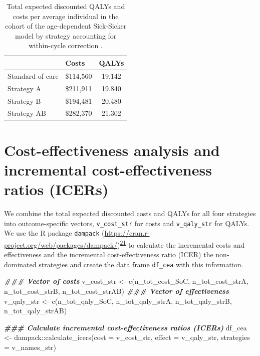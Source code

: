 \documentclass[
]{article}
\newenvironment{Shaded}{\begin{snugshade}}{\end{snugshade}}
\newcommand{\AttributeTok}[1]{\textcolor[rgb]{0.77,0.63,0.00}{#1}}
\newcommand{\DocumentationTok}[1]{\textcolor[rgb]{0.56,0.35,0.01}{\textbf{\textit{#1}}}}
\newcommand{\FunctionTok}[1]{\textcolor[rgb]{0.00,0.00,0.00}{#1}}
\newcommand{\NormalTok}[1]{#1}
\newcommand{\OtherTok}[1]{\textcolor[rgb]{0.56,0.35,0.01}{#1}}
\newcommand{\SpecialCharTok}[1]{\textcolor[rgb]{0.00,0.00,0.00}{#1}}
\begin{document}
\begin{table}[!h]

\caption{\label{tab:Expected-outcomes-table}Total expected discounted QALYs and costs per average individual in the cohort of the age-dependent Sick-Sicker model by strategy accounting for within-cycle correction .}
\centering
\begin{tabular}[t]{llc}
\toprule
  & Costs & QALYs\\
\midrule
Standard of care & \$114,560 & 19.142\\
Strategy A & \$211,911 & 19.840\\
Strategy B & \$194,481 & 20.480\\
Strategy AB & \$282,370 & 21.302\\
\bottomrule
\end{tabular}
\end{table}

\hypertarget{cost-effectiveness-analysis-and-incremental-cost-effectiveness-ratios-icers}{%
\section{Cost-effectiveness analysis and incremental cost-effectiveness ratios (ICERs)}\label{cost-effectiveness-analysis-and-incremental-cost-effectiveness-ratios-icers}}

We combine the total expected discounted costs and QALYs for all four strategies into outcome-specific vectors, \texttt{v\_cost\_str} for costs and \texttt{v\_qaly\_str} for QALYs. We use the R package \texttt{dampack} (\url{https://cran.r-project.org/web/packages/dampack/})\textsuperscript{\protect\hyperlink{ref-Alarid-Escudero2021}{21}} to calculate the incremental costs and effectiveness and the incremental cost-effectiveness ratio (ICER) the non-dominated strategies and create the data frame \texttt{df\_cea} with this information.

\begin{Shaded}
\begin{Highlighting}[]
\DocumentationTok{\#\#\# Vector of costs}
\NormalTok{v\_cost\_str }\OtherTok{\textless{}{-}} \FunctionTok{c}\NormalTok{(n\_tot\_cost\_SoC, n\_tot\_cost\_strA, n\_tot\_cost\_strB, n\_tot\_cost\_strAB)}
\DocumentationTok{\#\#\# Vector of effectiveness}
\NormalTok{v\_qaly\_str }\OtherTok{\textless{}{-}} \FunctionTok{c}\NormalTok{(n\_tot\_qaly\_SoC, n\_tot\_qaly\_strA, n\_tot\_qaly\_strB, n\_tot\_qaly\_strAB)}

\DocumentationTok{\#\#\# Calculate incremental cost{-}effectiveness ratios (ICERs)}
\NormalTok{df\_cea }\OtherTok{\textless{}{-}}\NormalTok{ dampack}\SpecialCharTok{::}\FunctionTok{calculate\_icers}\NormalTok{(}\AttributeTok{cost =}\NormalTok{ v\_cost\_str, }
                                   \AttributeTok{effect =}\NormalTok{ v\_qaly\_str,}
                                   \AttributeTok{strategies =}\NormalTok{ v\_names\_str)}
\end{Highlighting}
\end{Shaded}
\end{document}
